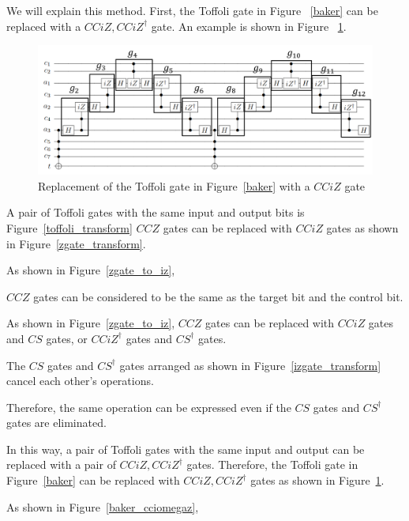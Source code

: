 We will explain this method.
First, the Toffoli gate in Figure ~\ref{baker} can be replaced with a $CCiZ, CCiZ^{\dag}$ gate.
An example is shown in Figure ~\ref{baker_cciz}.
\begin{figure}[tbp]
\centering
\includegraphics[width=15cm]{img/baker_izgate_transform.pdf}
\caption{Replacement of the Toffoli gate in Figure~\ref{baker} with a $CCiZ$ gate}
\label{baker_cciz}
\end{figure}
A pair of Toffoli gates with the same input and output bits is
Figure~\ref{toffoli_transform} $CCZ$ gates can be replaced with $CCiZ$ gates as shown in Figure~\ref{zgate_transform}.

As shown in Figure~\ref{zgate_to_iz},

$CCZ$ gates can be considered to be the same as the target bit and the control bit.

As shown in Figure~\ref{zgate_to_iz}, $CCZ$ gates can be replaced with $CCiZ$ gates and $CS$ gates, or $CCiZ^{\dag}$ gates and $CS^{\dag}$ gates.

The $CS$ gates and $CS^{\dag}$ gates arranged as shown in Figure~\ref{izgate_transform} cancel each other's operations.

Therefore, the same operation can be expressed even if the $CS$ gates and $CS^{\dag}$ gates are eliminated.

In this way, a pair of Toffoli gates with the same input and output can be replaced with a pair of $CCiZ, CCiZ^{\dag}$ gates.
Therefore, the Toffoli gate in Figure~\ref{baker} can be replaced with $CCiZ, CCiZ^{\dag}$ gates as shown in Figure~\ref{baker_cciz}.
\par
As shown in Figure~\ref{baker_cciomegaz},


